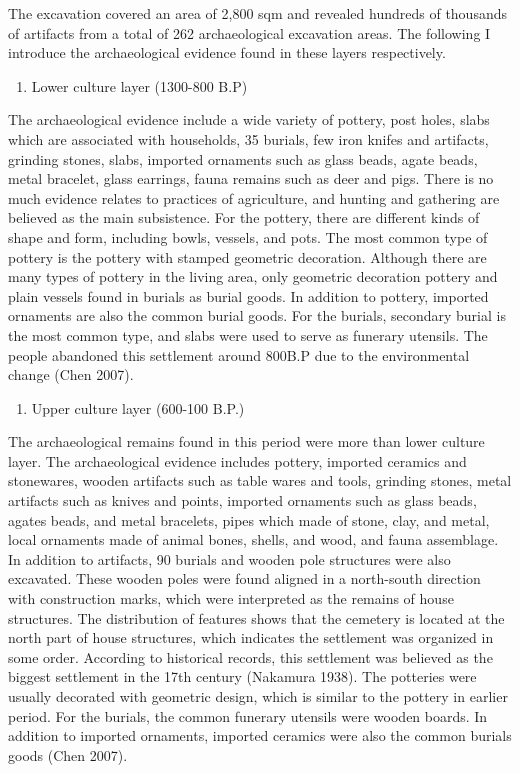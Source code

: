 \documentclass[10pt]{article}
\begin{document}
The excavation covered an area of 2,800 sqm and revealed hundreds of
thousands of artifacts from a total of 262 archaeological excavation
areas. The following I introduce the archaeological evidence found in
these layers respectively.

\begin{enumerate}
\def\labelenumi{\arabic{enumi}.}
\itemsep1pt\parskip0pt
\item
  Lower culture layer (1300-800 B.P)
\end{enumerate}

The archaeological evidence include a wide variety of pottery, post
holes, slabs which are associated with households, 35 burials, few iron
knifes and artifacts, grinding stones, slabs, imported ornaments such as
glass beads, agate beads, metal bracelet, glass earrings, fauna remains
such as deer and pigs. There is no much evidence relates to practices of
agriculture, and hunting and gathering are believed as the main
subsistence. For the pottery, there are different kinds of shape and
form, including bowls, vessels, and pots. The most common type of
pottery is the pottery with stamped geometric decoration. Although there
are many types of pottery in the living area, only geometric decoration
pottery and plain vessels found in burials as burial goods. In addition
to pottery, imported ornaments are also the common burial goods. For the
burials, secondary burial is the most common type, and slabs were used
to serve as funerary utensils. The people abandoned this settlement
around 800B.P due to the environmental change (Chen 2007).

\begin{enumerate}
\def\labelenumi{\arabic{enumi}.}
\setcounter{enumi}{1}
\itemsep1pt\parskip0pt
\item
  Upper culture layer (600-100 B.P.)
\end{enumerate}

The archaeological remains found in this period were more than lower
culture layer. The archaeological evidence includes pottery, imported
ceramics and stonewares, wooden artifacts such as table wares and tools,
grinding stones, metal artifacts such as knives and points, imported
ornaments such as glass beads, agates beads, and metal bracelets, pipes
which made of stone, clay, and metal, local ornaments made of animal
bones, shells, and wood, and fauna assemblage. In addition to artifacts,
90 burials and wooden pole structures were also excavated. These wooden
poles were found aligned in a north-south direction with construction
marks, which were interpreted as the remains of house structures. The
distribution of features shows that the cemetery is located at the north
part of house structures, which indicates the settlement was organized
in some order. According to historical records, this settlement was
believed as the biggest settlement in the 17th century (Nakamura 1938).
The potteries were usually decorated with geometric design, which is
similar to the pottery in earlier period. For the burials, the common
funerary utensils were wooden boards. In addition to imported ornaments,
imported ceramics were also the common burials goods (Chen 2007).
\end{document}
